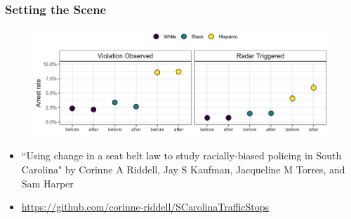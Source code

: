 \documentclass{beamer}
\begin{document}
\begin{frame}
\frametitle{Setting the Scene}


\begin{figure}
\includegraphics[scale=.5]{figures/arrestRates}
\end{figure}


\begin{itemize}

\item ``Using change in a seat belt law to study racially-biased policing in South Carolina" by Corinne A Riddell, Jay S Kaufman, Jacqueline M Torres, and Sam Harper

\item \url{https://github.com/corinne-riddell/SCarolinaTrafficStops}

\end{itemize}

\end{frame}
\end{document}
